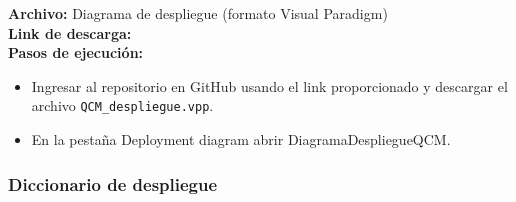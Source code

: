 \textbf{Archivo:} Diagrama de despliegue (formato Visual Paradigm) \\
\textbf{Link de descarga:} \linkDiagramaDespliegue \\

\textbf{Pasos de ejecución:}
\begin{itemize}
    \item Ingresar al repositorio en GitHub usando el link proporcionado y descargar el archivo \texttt{QCM\_despliegue.vpp}.
    \item En la pestaña Deployment diagram abrir DiagramaDespliegueQCM.
\end{itemize}

\subsubsection{Diccionario de despliegue}

